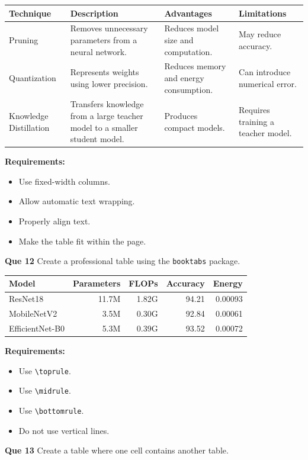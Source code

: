 \documentclass{article}
\begin{document}
\begin{center}
\begin{tabular}{|p{2.3cm}|p{3.8cm}|p{3.5cm}|p{3.2cm}|}
\hline
\textbf{Technique} & \textbf{Description} & \textbf{Advantages} & \textbf{Limitations} \\
\hline
Pruning & Removes unnecessary parameters from a neural network. & Reduces model size and computation. & May reduce accuracy. \\
\hline
Quantization & Represents weights using lower precision. & Reduces memory and energy consumption. & Can introduce numerical error. \\
\hline
Knowledge Distillation & Transfers knowledge from a large teacher model to a smaller student model. & Produces compact models. & Requires training a teacher model. \\
\hline
\end{tabular}
\end{center}

\noindent\textbf{Requirements:}
\begin{itemize}
    \item Use fixed-width columns.
    \item Allow automatic text wrapping.
    \item Properly align text.
    \item Make the table fit within the page.
\end{itemize}

\vspace{2em}

\noindent\textbf{Que 12} Create a professional table using the \texttt{booktabs} package.

\begin{center}
\begin{tabular}{lrrrr}
\toprule
\textbf{Model} & \textbf{Parameters} & \textbf{FLOPs} & \textbf{Accuracy} & \textbf{Energy} \\
\midrule
ResNet18        & 11.7M & 1.82G & 94.21 & 0.00093 \\
MobileNetV2     & 3.5M  & 0.30G & 92.84 & 0.00061 \\
EfficientNet-B0 & 5.3M  & 0.39G & 93.52 & 0.00072 \\
\bottomrule
\end{tabular}
\end{center}

\noindent\textbf{Requirements:}
\begin{itemize}
    \item Use \texttt{\textbackslash toprule}.
    \item Use \texttt{\textbackslash midrule}.
    \item Use \texttt{\textbackslash bottomrule}.
    \item Do not use vertical lines.
\end{itemize}
\noindent\textbf{Que 13} Create a table where one cell contains another table.
\end{document}
